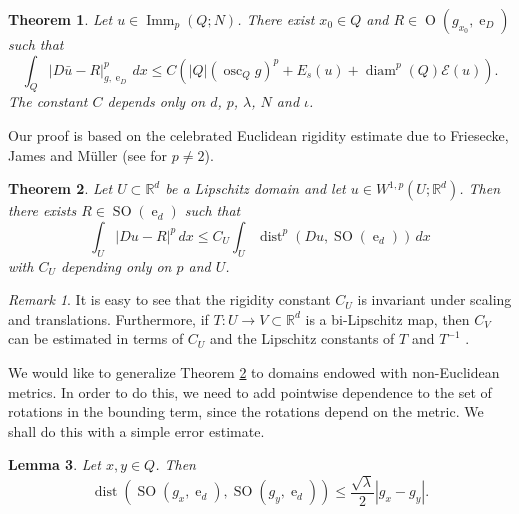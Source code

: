 \documentclass{article}
\numberwithin{equation}{section}
\newtheorem{theorem}{Theorem}[section]
\newtheorem{lemma}[theorem]{Lemma}
\theoremstyle{definition}
\theoremstyle{remark}
\newtheorem{remark}{Remark}[theorem]
\DeclareMathOperator{\diam}{diam}
\DeclareMathOperator{\dist}{dist}
\DeclareMathOperator{\e}{e}
\DeclareMathOperator{\Imm}{Imm}
\DeclareMathOperator{\Ort}{O}
\DeclareMathOperator*{\osc}{osc}
\DeclareMathOperator{\SO}{SO}
\begin{document}
\begin{theorem} \label{thm:codimension1_compact_rigidity}
    Let $u \in \Imm_p(Q; N)$. There exist $x_0 \in Q$ and $R \in \Ort(g_{x_0}, \e_D)$ such that
    \[
    \int_Q |D\bar{u} - R|_{g, \e_D}^p \, dx \le C \left(|Q| \left(\osc_Q g\right)^p + E_s(u) + \diam^p(Q) \mathcal{E}(u)\right).
    \]
    The constant $C$ depends only on $d$, $p$, $\lambda$, $N$ and $\iota$.
\end{theorem}

Our proof is based on the celebrated Euclidean rigidity estimate due to Friesecke, James and Müller \cite{FJM} (see \cite[Section 2.4]{CS} for $p \neq 2$).

\begin{theorem} \label{thm:euclidean_rigidity}
    Let $U \subset \mathbb{R}^d$ be a Lipschitz domain and let $u \in W^{1, p}(U; \mathbb{R}^d)$. Then there exists $R \in \SO(\e_d)$ such that
    \begin{equation} \label{eq:friesecke_james_müller}
        \int_U |Du - R|^p \, dx \le C_U \int_U \dist^p(Du, \SO(\e_d)) \, dx
    \end{equation}
    with $C_U$ depending only on $p$ and $U$.
\end{theorem}

\begin{remark} \label{rmk:bilipschitz_deformation}
    It is easy to see that the rigidity constant $C_U$ is invariant under scaling and translations. Furthermore, if $T : U \rightarrow V \subset \mathbb{R}^d$ is a bi-Lipschitz map, then $C_V$ can be estimated in terms of $C_U$ and the Lipschitz constants of $T$ and $T^{-1}$ \cite[Theorem 2.3]{LP}.
\end{remark}

We would like to generalize Theorem \ref{thm:euclidean_rigidity} to domains endowed with non-Euclidean metrics. In order to do this, we need to add pointwise dependence to the set of rotations in the bounding term, since the rotations depend on the metric. We shall do this with a simple error estimate.

\begin{lemma} \label{lm:distance_between_sets_of_oriented_matrices}
    Let $x, y \in Q$. Then
    \[
    \dist(\SO(g_x, \e_d), \SO(g_y, \e_d)) \le \frac{\sqrt{\lambda}}{2}|g_x - g_y|.
    \]
\end{lemma}
\end{document}
